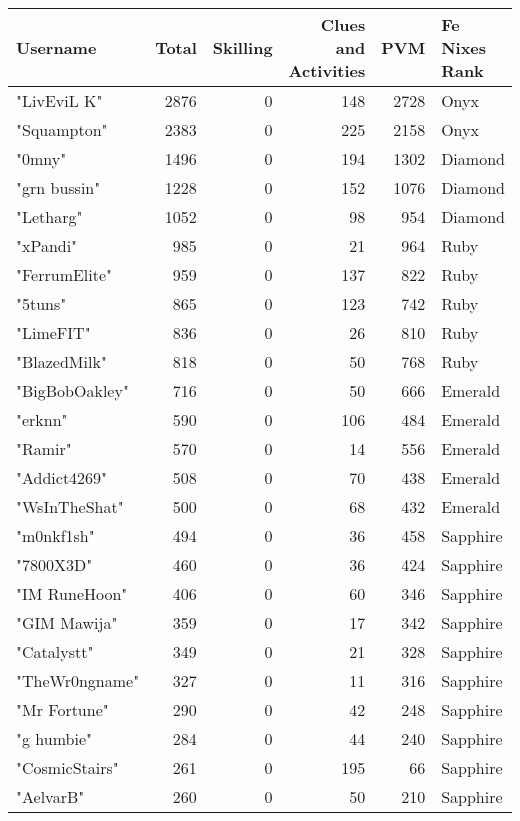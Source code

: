 \documentclass{article}
\begin{document}
\begin{table}[htbp]
\centering
{}
\begin{tabular}{|l|r|r|r|r|l|}
\hline
\textbf{Username} & \textbf{Total} & \textbf{Skilling} & \textbf{Clues and Activities} & \textbf{PVM} & \textbf{Fe Nixes Rank} \\ \hline
"LivEviL K" & 2876 & 0 & 148 & 2728 & Onyx \\ \hline
"Squampton" & 2383 & 0 & 225 & 2158 & Onyx \\ \hline
"0mny" & 1496 & 0 & 194 & 1302 & Diamond \\ \hline
"grn bussin" & 1228 & 0 & 152 & 1076 & Diamond \\ \hline
"Letharg" & 1052 & 0 & 98 & 954 & Diamond \\ \hline
"xPandi" & 985 & 0 & 21 & 964 & Ruby \\ \hline
"FerrumElite" & 959 & 0 & 137 & 822 & Ruby \\ \hline
"5tuns" & 865 & 0 & 123 & 742 & Ruby \\ \hline
"LimeFIT" & 836 & 0 & 26 & 810 & Ruby \\ \hline
"BlazedMilk" & 818 & 0 & 50 & 768 & Ruby \\ \hline
"BigBobOakley" & 716 & 0 & 50 & 666 & Emerald \\ \hline
"erknn" & 590 & 0 & 106 & 484 & Emerald \\ \hline
"Ramir" & 570 & 0 & 14 & 556 & Emerald \\ \hline
"Addict4269" & 508 & 0 & 70 & 438 & Emerald \\ \hline
"WsInTheShat" & 500 & 0 & 68 & 432 & Emerald \\ \hline
"m0nkf1sh" & 494 & 0 & 36 & 458 & Sapphire \\ \hline
"7800X3D" & 460 & 0 & 36 & 424 & Sapphire \\ \hline
"IM RuneHoon" & 406 & 0 & 60 & 346 & Sapphire \\ \hline
"GIM Mawija" & 359 & 0 & 17 & 342 & Sapphire \\ \hline
"Catalystt" & 349 & 0 & 21 & 328 & Sapphire \\ \hline
"TheWr0ngname" & 327 & 0 & 11 & 316 & Sapphire \\ \hline
"Mr Fortune" & 290 & 0 & 42 & 248 & Sapphire \\ \hline
"g humbie" & 284 & 0 & 44 & 240 & Sapphire \\ \hline
"CosmicStairs" & 261 & 0 & 195 & 66 & Sapphire \\ \hline
"AelvarB" & 260 & 0 & 50 & 210 & Sapphire \\ \hline

\end{tabular}
\end{table}
\end{document}
